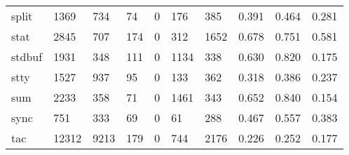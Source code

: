 \begin{longtable}{lp{1.3cm}p{1.3cm}p{1.3cm}p{1.3cm}p{1.3cm}p{1.3cm}p{1.3cm}p{1.3cm}p{1.3cm}}
split     &                   1369 &                                734 &                                74 &                                0 &                               176 &                             385 &                                0.391 &                                  0.464 &                                0.281 \\
stat      &                   2845 &                                707 &                               174 &                                0 &                               312 &                            1652 &                                0.678 &                                  0.751 &                                0.581 \\
stdbuf    &                   1931 &                                348 &                               111 &                                0 &                              1134 &                             338 &                                0.630 &                                  0.820 &                                0.175 \\
stty      &                   1527 &                                937 &                                95 &                                0 &                               133 &                             362 &                                0.318 &                                  0.386 &                                0.237 \\
sum       &                   2233 &                                358 &                                71 &                                0 &                              1461 &                             343 &                                0.652 &                                  0.840 &                                0.154 \\
sync      &                    751 &                                333 &                                69 &                                0 &                                61 &                             288 &                                0.467 &                                  0.557 &                                0.383 \\
tac       &                  12312 &                               9213 &                               179 &                                0 &                               744 &                            2176 &                                0.226 &                                  0.252 &                                0.177 \\

\end{longtable}
